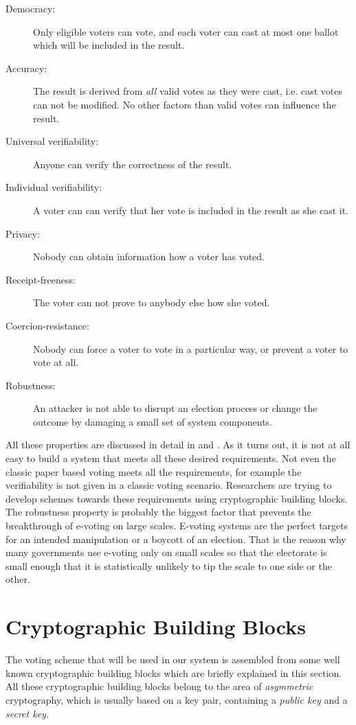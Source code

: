 \documentclass[numbers=noenddot, abstract=on, a4paper, headsepline,
footsepline, oneside, draft=off]{scrreprt}
\begin{document}
\begin{description}
  \item[Democracy:] Only eligible voters can vote, and each voter can
  cast at most one ballot which will be included in the result.
  \item[Accuracy:] The result is derived from \emph{all} valid
  votes as they were cast, i.e. cast votes can not be modified. No other factors
  than valid votes can influence the result.
  \item[Universal verifiability:] Anyone can verify the correctness of
  the result.
  \item[Individual verifiability:] A voter can can verify that her vote
  is included in the result as she cast it.
  \item[Privacy:] Nobody can obtain information how a voter has
  voted.
  \item[Receipt-freeness:] The voter can not prove to anybody else how
  she voted.
  \item[Coercion-resistance:] Nobody can force a voter to vote in a
  particular way, or prevent a voter to vote at all.
  \item[Robustness:] An attacker is not able to disrupt an election
  process or change the outcome by damaging a small set of system components. 
\end{description}

All these properties are discussed in detail in \cite{HS11} and \cite{Jonker09}.
As it turns out, it is not at all easy to build a system that meets all these
desired requirements. Not even the classic paper based voting meets all the
requirements, for example the verifiability is not given in a classic voting
scenario. Researchers are trying to develop schemes towards these requirements
using cryptographic building blocks. The robustness property is probably the
biggest factor that prevents the breakthrough of e-voting on large scales.
E-voting systems are the perfect targets for an intended manipulation or a
boycott of an election. That is the reason why many governments use e-voting
only on small scales so that the electorate is small enough that it is
statistically unlikely to tip the scale to one side or the other.

\section{Cryptographic Building Blocks}
\label{sec:buildingblocks}
The voting scheme that will be used in our system is assembled from some well
known cryptographic building blocks which are briefly explained in this section.
All these cryptographic building blocks belong to the area of \emph{asymmetric}
cryptography, which is usually based on a key pair, containing a
\emph{public key} and a \emph{secret key}.
\end{document}
